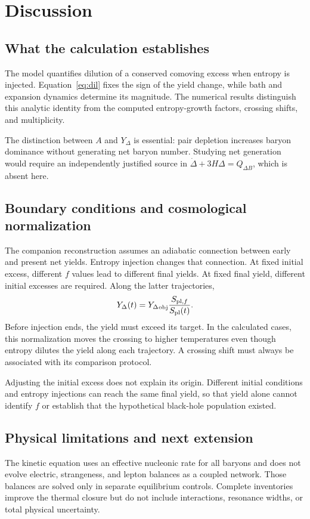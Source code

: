 \documentclass[10pt,a4paper,twocolumn]{article}
\newcommand{\Y}{{Y_\Delta}}
\begin{document}
\section{Discussion}
\subsection{What the calculation establishes}
The model quantifies dilution of a conserved comoving excess when entropy is injected. Equation~\eqref{eq:dil} fixes the sign of the yield change, while bath and expansion dynamics determine its magnitude. The numerical results distinguish this analytic identity from the computed entropy-growth factors, crossing shifts, and multiplicity.

The distinction between $A$ and $\Y$ is essential: pair depletion increases baryon dominance without generating net baryon number. Studying net generation would require an independently justified source in $\dot\Delta+3H\Delta=Q_{\Delta B}$, which is absent here.

\subsection{Boundary conditions and cosmological normalization}
The companion reconstruction assumes an adiabatic connection between early and present net yields. Entropy injection changes that connection. At fixed initial excess, different $f$ values lead to different final yields. At fixed final yield, different initial excesses are required. Along the latter trajectories,
\begin{equation}
\Y(t)=\Y_{\rm obj}\frac{S_{{\rm pl},f}}{S_{\rm pl}(t)}.
\end{equation}
Before injection ends, the yield must exceed its target. In the calculated cases, this normalization moves the crossing to higher temperatures even though entropy dilutes the yield along each trajectory. A crossing shift must always be associated with its comparison protocol.

Adjusting the initial excess does not explain its origin. Different initial conditions and entropy injections can reach the same final yield, so that yield alone cannot identify $f$ or establish that the hypothetical black-hole population existed.

\subsection{Physical limitations and next extension}
The kinetic equation uses an effective nucleonic rate for all baryons and does not evolve electric, strangeness, and lepton balances as a coupled network. Those balances are solved only in separate equilibrium controls. Complete inventories improve the thermal closure but do not include interactions, resonance widths, or total physical uncertainty.
\end{document}
